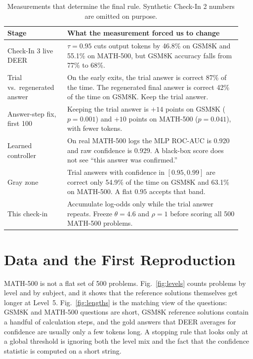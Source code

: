 \documentclass[conference]{IEEEtran}
\begin{document}
\begin{table}[t]
\caption{Measurements that determine the final rule. Synthetic Check-In 2 numbers are omitted on purpose.}
\label{tab:arc}
\centering
\footnotesize
\begin{tabular}{@{}>{\raggedright\arraybackslash}p{0.24\linewidth}>{\raggedright\arraybackslash}p{0.70\linewidth}@{}}
\toprule
Stage & What the measurement forced us to change \\
\midrule
Check-In 3 live DEER &
$\tau=0.95$ cuts output tokens by 46.8\% on GSM8K and 55.1\% on MATH-500, but GSM8K accuracy falls from 77\% to 68\%. \\
Trial vs.\ regenerated answer &
On the early exits, the trial answer is correct 87\% of the time. The regenerated final answer is correct 42\% of the time on GSM8K. Keep the trial answer. \\
Answer-step fix, first 100 &
Keeping the trial answer is $+14$ points on GSM8K ($p=0.001$) and $+10$ points on MATH-500 ($p=0.041$), with fewer tokens. \\
Learned controller &
On real MATH-500 logs the MLP ROC-AUC is 0.920 and raw confidence is 0.929. A black-box score does not see ``this answer was confirmed.'' \\
Gray zone &
Trial answers with confidence in $[0.95,0.99]$ are correct only 54.9\% of the time on GSM8K and 63.1\% on MATH-500. A flat $0.95$ accepts that band. \\
This check-in &
Accumulate log-odds only while the trial answer repeats. Freeze $\theta=4.6$ and $\rho=1$ before scoring all 500 MATH-500 problems. \\
\bottomrule
\end{tabular}
\end{table}

\section{Data and the First Reproduction}
\label{sec:data}
MATH-500 is not a flat set of 500 problems.
Fig.~\ref{fig:levels} counts problems by level and by subject, and it shows that the reference solutions themselves get longer at Level~5.
Fig.~\ref{fig:lengths} is the matching view of the questions: GSM8K and MATH-500 questions are short, GSM8K reference solutions contain a handful of calculation steps, and the gold answers that DEER averages for confidence are usually only a few tokens long.
A stopping rule that looks only at a global threshold is ignoring both the level mix and the fact that the confidence statistic is computed on a short string.
\end{document}
